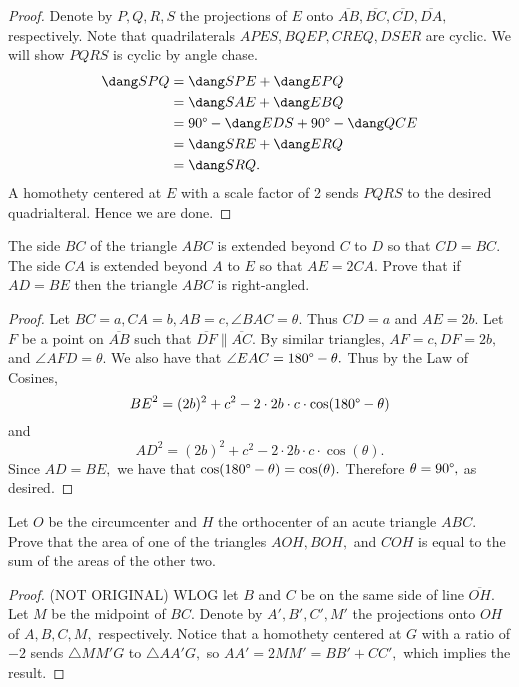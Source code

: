 \documentclass[letterpaper,oneside]{scrartcl}
\providecommand{\ol}{\overline}
\begin{document}
\begin{proof}
  Denote by $P,Q,R,S$ the projections of $E$ onto $\ol{AB},\ol{BC},\ol{CD},\ol{DA},$ respectively. Note that quadrilaterals $APES, BQEP, CREQ, DSER$ are cyclic. We will show $PQRS$ is cyclic by angle chase.
  \begin{align*}
    \dang SPQ & = \dang SPE + \dang EPQ                         \\
              & = \dang SAE + \dang EBQ                         \\
              & = 90\degree - \dang EDS + 90\degree - \dang QCE \\
              & = \dang SRE + \dang ERQ                         \\
              & = \dang SRQ.
  \end{align*}
  A homothety centered at $E$ with a scale factor of 2 sends $PQRS$ to the desired quadrialteral. Hence we are done.
\end{proof}

\begin{problem*}
  [3.26 (EGMO 2013/1)]
  The side $BC$ of the triangle $ABC$ is extended beyond $C$ to $D$ so that $CD=BC$. The side $CA$ is extended beyond $A$ to $E$ so that $AE=2CA$. Prove that if $AD=BE$ then the triangle $ABC$ is right-angled.
\end{problem*}

\begin{proof}
  Let $BC=a, CA=b, AB=c,\angle BAC = \theta.$ Thus $CD = a$ and $AE = 2b.$ Let $F$ be a point on $\ol{AB}$ such that $\ol{DF} \parallel \ol{AC}.$ By similar triangles, $AF=c, DF = 2b,$ and $\angle AFD = \theta.$ We also have that $\angle EAC = 180\degree - \theta.$ Thus by the Law of Cosines,
  $${BE}^2 = (2b)^2+c^2-2\cdot 2b \cdot c\cdot\cos(180\degree - \theta)$$ and $${AD}^2 = (2b)^2+c^2-2\cdot 2b \cdot c\cdot\cos(\theta).$$
  Since $AD = BE,$ we have that $\cos(180\degree - \theta) = \cos(\theta).$ Therefore $\theta = 90\degree,$ as desired.
\end{proof}

\begin{problem*}
  [3.27 (APMO 2004/2)]
  Let $O$ be the circumcenter and $H$ the orthocenter of an acute triangle $ABC$. Prove that the area of one of the triangles $AOH, BOH,$ and $COH$ is equal to the sum of the areas of the other two.
\end{problem*}
\begin{proof}
  (NOT ORIGINAL) WLOG let $B$ and $C$ be on the same side of line $\ol{OH}.$ Let $M$ be the midpoint of $BC.$ Denote by $A',B',C',M'$ the projections onto $OH$ of $A,B,C,M,$ respectively. Notice that a homothety centered at $G$ with a ratio of $-2$ sends $\triangle MM'G$ to $\triangle AA'G,$ so $AA' = 2MM' = BB' + CC',$ which implies the result.
\end{proof}
\end{document}
